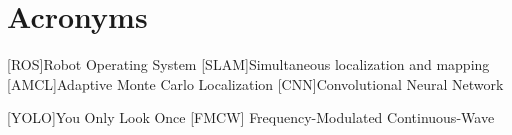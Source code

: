 \chapter*{Acronyms}
	\begin{acronym}[RELAX NG]
	[ROS]{Robot Operating System}
	[SLAM]{Simultaneous localization and mapping}
    [AMCL]{Adaptive Monte Carlo Localization}
	[CNN]{Convolutional Neural Network}
	

	[YOLO]{You Only Look Once}
	 [FMCW] {Frequency-Modulated Continuous-Wave}
	
	\end{acronym}
